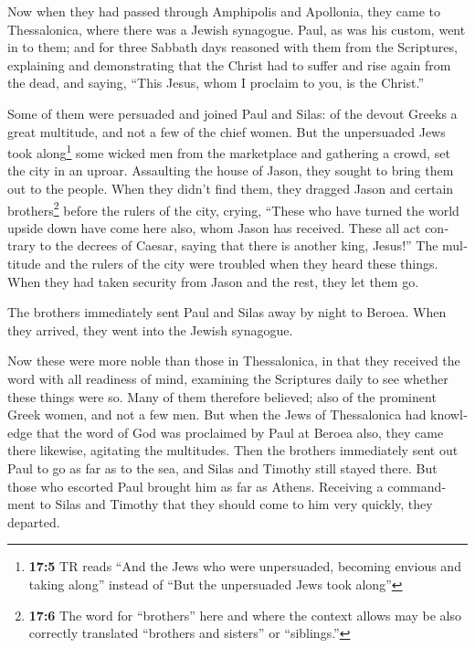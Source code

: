 \begin{paracol}{2}
\begin{otherlanguage}{english}
 Now when they had passed through Amphipolis and
Apollonia, they came to Thessalonica, where there was a Jewish
synagogue.  Paul, as was his custom, went in to them; and
for three Sabbath days reasoned with them from the Scriptures,
 explaining and demonstrating that the Christ had to
suffer and rise again from the dead, and saying, ``This Jesus, whom I
proclaim to you, is the Christ.''

 Some of them were persuaded and joined Paul and Silas: of
the devout Greeks a great multitude, and not a few of the chief women.
 But the unpersuaded Jews took along\footnote{\textbf{17:5}
  TR reads ``And the Jews who were unpersuaded, becoming envious and
  taking along'' instead of ``But the unpersuaded Jews took along''}
some wicked men from the marketplace and gathering a crowd, set the city
in an uproar. Assaulting the house of Jason, they sought to bring them
out to the people.  When they didn't find them, they
dragged Jason and certain brothers\footnote{\textbf{17:6} The word for
  ``brothers'' here and where the context allows may be also correctly
  translated ``brothers and sisters'' or ``siblings.''} before the
rulers of the city, crying, ``These who have turned the world upside
down have come here also,  whom Jason has received. These
all act contrary to the decrees of Caesar, saying that there is another
king, Jesus!''  The multitude and the rulers of the city
were troubled when they heard these things.  When they had
taken security from Jason and the rest, they let them go.

 The brothers immediately sent Paul and Silas away by
night to Beroea. When they arrived, they went into the Jewish synagogue.

 Now these were more noble than those in Thessalonica, in
that they received the word with all readiness of mind, examining the
Scriptures daily to see whether these things were so. 
Many of them therefore believed; also of the prominent Greek women, and
not a few men.  But when the Jews of Thessalonica had
knowledge that the word of God was proclaimed by Paul at Beroea also,
they came there likewise, agitating the multitudes.  Then
the brothers immediately sent out Paul to go as far as to the sea, and
Silas and Timothy still stayed there.  But those who
escorted Paul brought him as far as Athens. Receiving a commandment to
Silas and Timothy that they should come to him very quickly, they
departed.


\end{otherlanguage}
\end{paracol}

